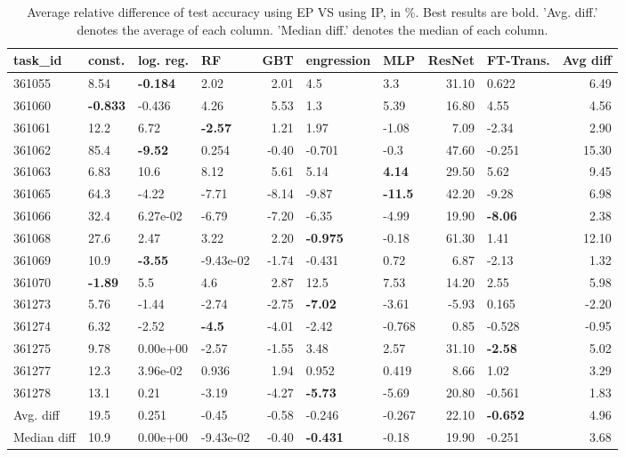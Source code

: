 \begin{table}[ht!]
\centering
\begingroup\footnotesize
\begin{tabular}{llllrllrlr}
  \hline
\hline
task\_id & const. & log. reg. & RF & GBT & engression & MLP & ResNet & FT-Trans. & Avg diff \\ 
  \hline
361055 & 8.54 & \textbf{-0.184} & 2.02 & 2.01 & 4.5 & 3.3 & 31.10 & 0.622 & 6.49 \\ 
  361060 & \textbf{-0.833} & -0.436 & 4.26 & 5.53 & 1.3 & 5.39 & 16.80 & 4.55 & 4.56 \\ 
  361061 & 12.2 & 6.72 & \textbf{-2.57} & 1.21 & 1.97 & -1.08 & 7.09 & -2.34 & 2.90 \\ 
  361062 & 85.4 & \textbf{-9.52} & 0.254 & -0.40 & -0.701 & -0.3 & 47.60 & -0.251 & 15.30 \\ 
  361063 & 6.83 & 10.6 & 8.12 & 5.61 & 5.14 & \textbf{4.14} & 29.50 & 5.62 & 9.45 \\ 
  361065 & 64.3 & -4.22 & -7.71 & -8.14 & -9.87 & \textbf{-11.5} & 42.20 & -9.28 & 6.98 \\ 
  361066 & 32.4 &  6.27e-02 & -6.79 & -7.20 & -6.35 & -4.99 & 19.90 & \textbf{-8.06} & 2.38 \\ 
  361068 & 27.6 & 2.47 & 3.22 & 2.20 & \textbf{-0.975} & -0.18 & 61.30 & 1.41 & 12.10 \\ 
  361069 & 10.9 & \textbf{-3.55} & -9.43e-02 & -1.74 & -0.431 & 0.72 & 6.87 & -2.13 & 1.32 \\ 
  361070 & \textbf{-1.89} & 5.5 & 4.6 & 2.87 & 12.5 & 7.53 & 14.20 & 2.55 & 5.98 \\ 
  361273 & 5.76 & -1.44 & -2.74 & -2.75 & \textbf{-7.02} & -3.61 & -5.93 & 0.165 & -2.20 \\ 
  361274 & 6.32 & -2.52 & \textbf{-4.5} & -4.01 & -2.42 & -0.768 & 0.85 & -0.528 & -0.95 \\ 
  361275 & 9.78 &  0.00e+00 & -2.57 & -1.55 & 3.48 & 2.57 & 31.10 & \textbf{-2.58} & 5.02 \\ 
  361277 & 12.3 &  3.96e-02 & 0.936 & 1.94 & 0.952 & 0.419 & 8.66 & 1.02 & 3.29 \\ 
  361278 & 13.1 & 0.21 & -3.19 & -4.27 & \textbf{-5.73} & -5.69 & 20.80 & -0.561 & 1.83 \\ 
   \hline
Avg. diff & 19.5 & 0.251 & -0.45 & -0.58 & -0.246 & -0.267 & 22.10 & \textbf{-0.652} & 4.96 \\ 
  Median diff & 10.9 &  0.00e+00 & -9.43e-02 & -0.40 & \textbf{-0.431} & -0.18 & 19.90 & -0.251 & 3.68 \\ 
   \hline
\hline
\end{tabular}
\endgroup
\caption{Average relative difference of test accuracy using EP VS using IP, in \%. 
                  Best results are bold. 
                  'Avg. diff.' denotes the average of each column.
                  'Median diff.' denotes the median of each column.} 
\label{TABLES/table_results_accuracy_mahalanobis_only_num_features_EP_VS_IP}
\end{table}

